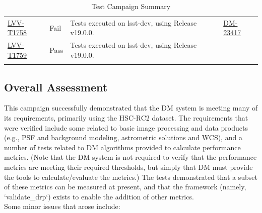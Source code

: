 \documentclass[DM,STR,toc]{lsstdoc}
\begin{document}
\begin{longtable}{p{2cm}p{2.5cm}p{9cm}p{2.5cm}}
\begin{minipage}[]{9cm}
    \medskip
    \end{minipage}
    &
    \\\hline
\href{https://jira.lsstcorp.org/secure/Tests.jspa#/testCase/LVV-T1758}{LVV-T1758}
    & Fail &
    \begin{minipage}[]{9cm}
    \smallskip
     Tests executed on lsst-dev, using Release v19.0.0.

    \medskip
    \end{minipage}
    &
          \href{https://jira.lsstcorp.org/browse/DM-23417}{DM-23417}
    \\\hline
\href{https://jira.lsstcorp.org/secure/Tests.jspa#/testCase/LVV-T1759}{LVV-T1759}
    & Pass &
    \begin{minipage}[]{9cm}
    \smallskip
     Tests executed on lsst-dev, using Release v19.0.0.

    \medskip
    \end{minipage}
    &
    \\\hline
\caption{Test Campaign Summary}
\label{table:summary}
\end{longtable}

\subsection{Overall Assessment}
\label{sect:overallassessment}

 This campaign successfully demonstrated that the DM system is meeting
many of its requirements, primarily using the HSC-RC2 dataset. The
requirements that were verified include some related to basic image
processing and data products (e.g., PSF and background modeling,
astrometric solutions and WCS), and a number of tests related to DM
algorithms provided to calculate performance metrics. (Note that the DM
system is not required to verify that the performance metrics are
meeting their required thresholds, but simply that DM must provide the
tools to calculate/evaluate the metrics.) The tests demonstrated that a
subset of these metrics can be measured at present, and that the
framework (namely, `validate\_drp`) exists to enable the addition of
other metrics.\\[2\baselineskip]Some minor issues that arose include:
\end{document}
